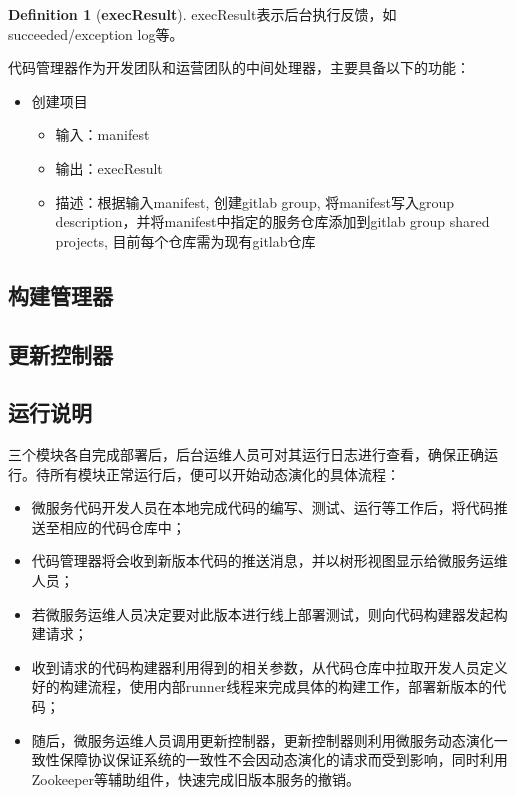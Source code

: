 \documentclass[12pt,a4paper]{article}
\theoremstyle{definition}
\newtheorem{definition}{Definition}[section]
\begin{document}
\theoremstyle{definition}
\begin{definition}[\textbf{execResult}]
\label{definition:execResult}
execResult表示后台执行反馈，如succeeded/exception log等。
\end{definition}
代码管理器作为开发团队和运营团队的中间处理器，主要具备以下的功能：
\begin{itemize}
	\item{创建项目
		\begin{itemize}
		\item 输入：manifest
		\item 输出：execResult
		\item 描述：根据输入manifest, 创建gitlab group, 将manifest写入group description，并将manifest中指定的服务仓库添加到gitlab group shared projects, 目前每个仓库需为现有gitlab仓库
	\end{itemize}}
\end{itemize}

\subsection{构建管理器}

\subsection{更新控制器}

\subsection{运行说明}
三个模块各自完成部署后，后台运维人员可对其运行日志进行查看，确保正确运行。待所有模块正常运行后，便可以开始动态演化的具体流程：

\begin{itemize}
	\item 微服务代码开发人员在本地完成代码的编写、测试、运行等工作后，将代码推送至相应的代码仓库中；
	\item 代码管理器将会收到新版本代码的推送消息，并以树形视图显示给微服务运维人员；
	\item 若微服务运维人员决定要对此版本进行线上部署测试，则向代码构建器发起构建请求；
	\item 收到请求的代码构建器利用得到的相关参数，从代码仓库中拉取开发人员定义好的构建流程，使用内部runner线程来完成具体的构建工作，部署新版本的代码；
	\item 随后，微服务运维人员调用更新控制器，更新控制器则利用微服务动态演化一致性保障协议保证系统的一致性不会因动态演化的请求而受到影响，同时利用Zookeeper等辅助组件，快速完成旧版本服务的撤销。
\end{itemize}

\end{document}
